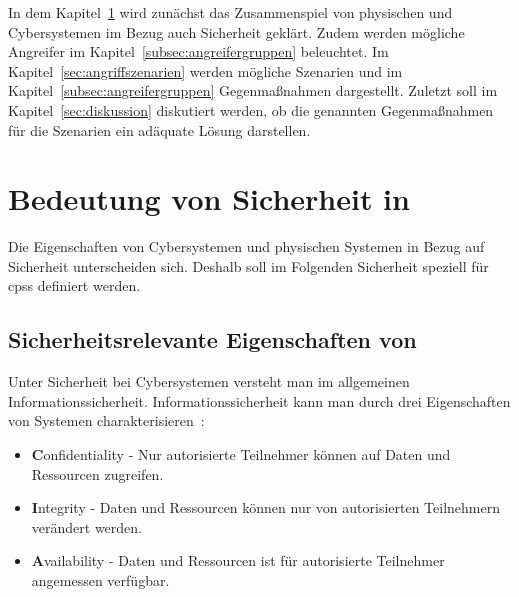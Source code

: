 \documentclass[final,bibliography=totocnumbered]{include/sikseminar}
\newcommand{\fb}[1]{\dofb#1}
\newcommand{\cps}{\glspl{cps}\xspace}
\newcommand{\dofb}[1]{\textbf{#1}\nobreak\hspace{0pt}}
\begin{document}
In dem Kapitel~\ref{sec:bedeutung-sicherheit} wird zunächst das Zusammenspiel von physischen und Cybersystemen im Bezug auch Sicherheit geklärt.
Zudem werden mögliche Angreifer im Kapitel~\ref{subsec:angreifergruppen} beleuchtet.
Im Kapitel~\ref{sec:angriffszenarien} werden mögliche Szenarien und im Kapitel~\ref{subsec:angreifergruppen} Gegenmaßnahmen dargestellt.
Zuletzt soll im Kapitel~\ref{sec:diskussion} diskutiert werden, ob die genannten Gegenmaßnahmen für die Szenarien ein adäquate Lösung darstellen.

\section{Bedeutung von Sicherheit in }\label{sec:bedeutung-sicherheit}

Die Eigenschaften von Cybersystemen und physischen Systemen in Bezug auf Sicherheit unterscheiden sich.
Deshalb soll im Folgenden Sicherheit speziell für \cps definiert werden.

\subsection{Sicherheitsrelevante Eigenschaften von }\label{subsec:definition}
Unter Sicherheit bei Cybersystemen versteht man im allgemeinen Informationssicherheit.
Informationssicherheit kann man durch drei Eigenschaften von Systemen charakterisieren~\cite{Cherdantseva2013}:
\begin{itemize}[noitemsep,wide=0pt]
    \item \fb{Confidentiality} - Nur autorisierte Teilnehmer können auf Daten und Ressourcen zugreifen.\label{def:confidentiality}
    \item \fb{Integrity} - Daten und Ressourcen können nur von autorisierten Teilnehmern verändert werden.\label{def:integrity}
    \item \fb{Availability} - Daten und Ressourcen ist für autorisierte Teilnehmer angemessen verfügbar.\label{def:availability}
\end{itemize}
\end{document}
